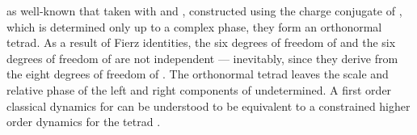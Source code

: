 \documentclass[a4paper,twocolumn,showpacs,preprintnumbers,aps]{revtex4}
\begin{document}
as well-known that taken with \coordHE{} and \coordHE{}, constructed using
the charge conjugate of \myHighlight{$\psi$}\coordHE{}, which is determined only up to a complex phase, they
form an orthonormal tetrad. As a result of Fierz identities, the six degrees of freedom
of \coordHE{} and the six degrees of freedom of \coordHE{} are not independent
--- inevitably, since they derive from the eight degrees of freedom of \myHighlight{$\psi$}\coordHE{}. The
orthonormal tetrad \coordHE{} leaves the scale and relative phase
\coordHE{} of the left and right components of \myHighlight{$\psi$}\coordHE{} undetermined.
A first order classical dynamics for \myHighlight{$\psi$}\coordHE{} can be understood to be equivalent to a
constrained higher order dynamics for the tetrad \coordHE{}.
\end{document}
